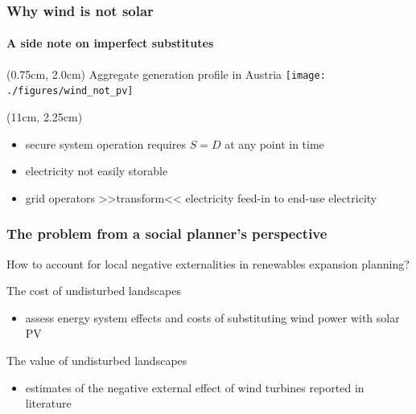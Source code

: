 \documentclass[aspectratio=169, xcolor=dvipsnames]{beamer}
\begin{document}
\begin{frame}
\frametitle{Why wind is not solar}
\framesubtitle{A side note on imperfect substitutes}
\begin{textblock*}{10cm}(0.75cm, 2.0cm) %
\centering
Aggregate generation profile in Austria
\texttt{[image: ./figures/wind\_not\_pv]}
\end{textblock*}
\begin{textblock*}{4cm}(11cm, 2.25cm)
\bigskip
\begin{itemize}
\item secure system operation requires $S=D$ at any point in time
\item electricity not easily storable
\item grid operators >>transform<< electricity feed-in to end-use electricity
\end{itemize}
\end{textblock*}
\end{frame}


\begin{frame}
\frametitle{The problem from a social planner's perspective}
How to account for local negative externalities in renewables expansion planning?

\bigskip
\textcolor{bokugreen}{The cost of undisturbed landscapes}
\begin{itemize}
\item assess energy system effects and costs of substituting wind power with solar PV
\end{itemize}

\bigskip
\textcolor{bokugreen}{The value of undisturbed landscapes}
\begin{itemize}
\item estimates of the negative external effect of wind turbines reported in literature
\end{itemize}
\end{frame}
\end{document}
